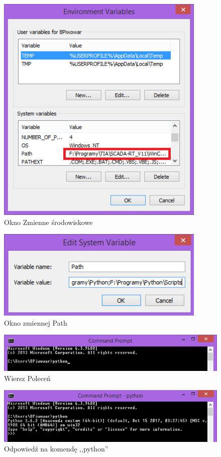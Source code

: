 \begin{figure}[h]
\centering
\includegraphics[width=10cm]{Zdjecia/5/anaconda5}
\caption{Okno Zmienne środowiskowe}
\label{fig:anaconda5}
\end{figure}

\begin{figure}[h]
\centering
\includegraphics[width=10cm]{Zdjecia/5/python6}
\caption{Okno zmiennej Path}
\label{fig:python6}
\end{figure}


\begin{figure}[h]
\centering
\includegraphics[width=14cm]{Zdjecia/5/python7}
\caption{Wiersz Poleceń}
\label{fig:python7}
\end{figure}

\begin{figure}[h]
\centering
\includegraphics[width=14cm]{Zdjecia/5/python8}
\caption{Odpowiedź na komendę ,,python''}
\label{fig:python8}
\end{figure}

